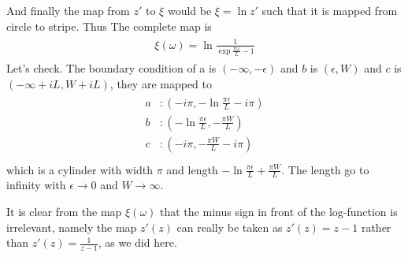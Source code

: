 \documentclass{article}
\begin{document}
And finally the map from $z'$ to $\xi$ would be $\xi = \ln z'$ such that it is mapped from circle to stripe. Thus The complete map is 
\begin{eqnarray}\begin{aligned}
\xi(\omega) = \ln\frac{1}{\exp\frac{\pi\omega}{L}-1}
\end{aligned}\end{eqnarray}
Let's check. The boundary condition of a is $(-\infty,-\epsilon)$ and $b$ is $(\epsilon,W)$ and $c$ is $(-\infty+iL,W+iL)$, they are mapped to
\begin{eqnarray}\begin{aligned}
a&: (-i\pi,-\ln\frac{\pi\epsilon}{L}-i\pi) \\
b&: (-\ln\frac{\pi\epsilon}{L},-\frac{\pi W}{L}) \\
c&: (-i\pi,-\frac{\pi W}{L}-i\pi) \\
\end{aligned}\end{eqnarray}
which is a cylinder with width $\pi$ and length $-\ln\frac{\pi\epsilon}{L}+\frac{\pi W}{L}$. The length go to infinity with $\epsilon\rightarrow0$ and $W\rightarrow\infty$. 

It is clear from the map $\xi(\omega)$ that the minus sign in front of the log-function is irrelevant, namely the map $z'(z)$ can really be taken as $z'(z)=z-1$ rather than $z'(z)=\frac{1}{z-1}$, as we did here. 

\end{document}
